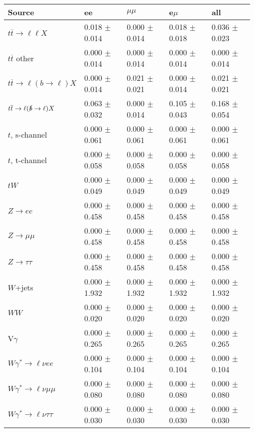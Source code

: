 \begin{tabular}{l | l l l l}
\hline\hline
 Source  &  ee  &  $\mu\mu$  &  e$\mu$  &  all \\
\hline
$t\overline{t}\rightarrow \ell\ell X$ &  0.018 $\pm$  0.014 &  0.000 $\pm$  0.014 &  0.018 $\pm$  0.018 &  0.036 $\pm$  0.023\\
$t\overline{t}$ other &  0.000 $\pm$  0.014 &  0.000 $\pm$  0.014 &  0.000 $\pm$  0.014 &  0.000 $\pm$  0.014\\
$t\overline{t}\rightarrow \ell(b\rightarrow \ell)X$ &  0.000 $\pm$  0.014 &  0.021 $\pm$  0.021 &  0.000 $\pm$  0.014 &  0.021 $\pm$  0.021\\
$t\overline{t}\rightarrow \ell(\slashed{b}\rightarrow \ell)X$ &  0.063 $\pm$  0.032 &  0.000 $\pm$  0.014 &  0.105 $\pm$  0.043 &  0.168 $\pm$  0.054\\
\hline
$t$, s-channel &  0.000 $\pm$  0.061 &  0.000 $\pm$  0.061 &  0.000 $\pm$  0.061 &  0.000 $\pm$  0.061\\
$t$, t-channel &  0.000 $\pm$  0.058 &  0.000 $\pm$  0.058 &  0.000 $\pm$  0.058 &  0.000 $\pm$  0.058\\
$tW$ &  0.000 $\pm$  0.049 &  0.000 $\pm$  0.049 &  0.000 $\pm$  0.049 &  0.000 $\pm$  0.049\\
\hline
$Z\rightarrow ee$ &  0.000 $\pm$  0.458 &  0.000 $\pm$  0.458 &  0.000 $\pm$  0.458 &  0.000 $\pm$  0.458\\
$Z\rightarrow\mu\mu$ &  0.000 $\pm$  0.458 &  0.000 $\pm$  0.458 &  0.000 $\pm$  0.458 &  0.000 $\pm$  0.458\\
$Z\rightarrow\tau\tau$ &  0.000 $\pm$  0.458 &  0.000 $\pm$  0.458 &  0.000 $\pm$  0.458 &  0.000 $\pm$  0.458\\
$W$+jets &  0.000 $\pm$  1.932 &  0.000 $\pm$  1.932 &  0.000 $\pm$  1.932 &  0.000 $\pm$  1.932\\
$WW$ &  0.000 $\pm$  0.020 &  0.000 $\pm$  0.020 &  0.000 $\pm$  0.020 &  0.000 $\pm$  0.020\\
\hline
V$\gamma$ &  0.000 $\pm$  0.265 &  0.000 $\pm$  0.265 &  0.000 $\pm$  0.265 &  0.000 $\pm$  0.265\\
$W\gamma^{*}\rightarrow\ell\nu e e$ &  0.000 $\pm$  0.104 &  0.000 $\pm$  0.104 &  0.000 $\pm$  0.104 &  0.000 $\pm$  0.104\\
$W\gamma^{*}\rightarrow\ell\nu\mu\mu$ &  0.000 $\pm$  0.080 &  0.000 $\pm$  0.080 &  0.000 $\pm$  0.080 &  0.000 $\pm$  0.080\\
$W\gamma^{*}\rightarrow\ell\nu\tau\tau$ &  0.000 $\pm$  0.030 &  0.000 $\pm$  0.030 &  0.000 $\pm$  0.030 &  0.000 $\pm$  0.030\\

\end{tabular}
